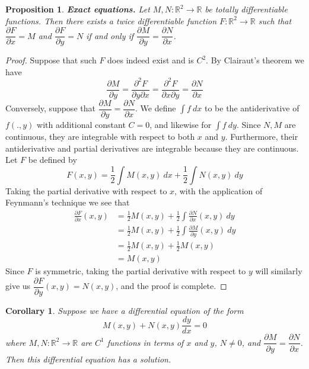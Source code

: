 \documentclass{article}
\theoremstyle{plain} %
\numberwithin{thm}{section} %
\newtheorem{prop}[thm]{Proposition}
\newtheorem{cor}[thm]{Corollary}
\theoremstyle{definition}
\begin{document}
    \begin{prop}
        \textbf{Exact equations.} Let \(M,N : \mathbb{R}^2 \to \mathbb{R}\) be totally differentiable functions. Then there exists a twice differentiable function \(F: \mathbb{R}^2 \to \mathbb{R}\) such that \(\dfrac{\partial F}{\partial x} = M\) and \(\dfrac{\partial F}{\partial y} = N\) if and only if \(\dfrac{\partial M}{\partial y} = \dfrac{\partial N}{\partial x}\).
    \end{prop}
    \begin{proof}
        Suppose that such \(F\) does indeed exist and is \(C^2\). By Clairaut's theorem we have
        \[
            \frac{\partial M}{\partial y} = \frac{\partial^2 F}{\partial y \partial x} = \frac{\partial^2 F}{\partial x \partial y} = \frac{\partial N}{\partial x}
        \]
        Conversely, suppose that \(\dfrac{\partial M}{\partial y} = \dfrac{\partial N}{\partial x}\). We define \(\int f\ dx\) to be the antiderivative of \(f(.,y)\) with additional constant \(C=0\), and likewise for \(\int f\ dy\). Since \(N,M\) are continuous, they are integrable with respect to both \(x\) and \(y\). Furthermore, their antiderivative and partial derivatives are integrable because they are continuous. Let \(F\) be defined by
        \[
            F(x,y) = \frac{1}{2}\int M(x,y)\ dx + \frac{1}{2}\int N(x,y)\ dy
        \]
        Taking the partial derivative with respect to \(x\), with the application of Feynmann's technique we see that
        \begin{align*}
            \frac{\partial F}{\partial x} (x,y) &= \frac{1}{2}M(x,y) + \frac{1}{2}\int \frac{\partial N}{\partial x} (x,y)\ dy \\
            &= \frac{1}{2}M(x,y) + \frac{1}{2}\int \frac{\partial M}{\partial y} (x,y)\ dy \\
            &= \frac{1}{2}M(x,y) + \frac{1}{2}M(x,y) \\
            &= M(x,y)
        \end{align*}
        Since \(F\) is symmetric, taking the partial derivative with respect to \(y\) will similarly give us \(\dfrac{\partial F}{\partial y} (x,y) = N(x,y)\), and the proof is complete.
        \smallbreak
    \end{proof}
    \begin{cor}
        Suppose we have a differential equation of the form
        \[
            M(x,y) + N(x,y) \frac{dy}{dx} = 0
        \]
        where \(M,N: \mathbb{R}^2 \to \mathbb{R}\) are \(C^1\) functions in terms of \(x\) and \(y\), \(N \neq 0\), and \(\dfrac{\partial M}{\partial y} = \dfrac{\partial N}{\partial x}\). Then this differential equation has a solution.
    \end{cor}
\end{document}
